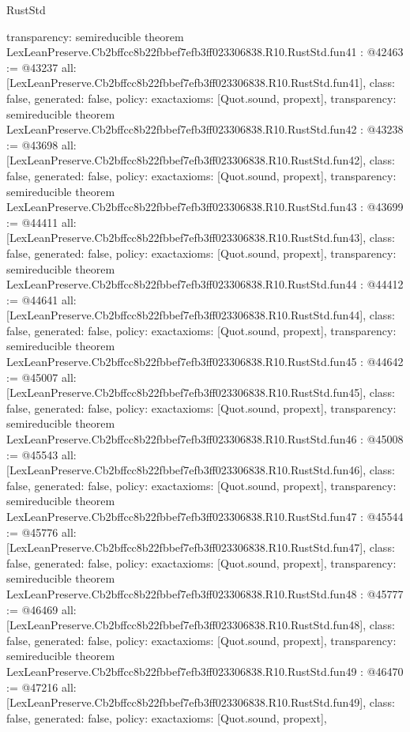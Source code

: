 \begin{lexlean}{RustStd}
\begin{coremodule}
{  transparency: semireducible
}
theorem LexLeanPreserve.Cb2bffcc8b22fbbef7efb3ff023306838.R10.RustStd.fun41 : @42463 := @43237 {
  all: [LexLeanPreserve.Cb2bffcc8b22fbbef7efb3ff023306838.R10.RustStd.fun41],
  class: false,
  generated: false,
  policy: exact{axioms: [Quot.sound, propext]},
  transparency: semireducible
}
theorem LexLeanPreserve.Cb2bffcc8b22fbbef7efb3ff023306838.R10.RustStd.fun42 : @43238 := @43698 {
  all: [LexLeanPreserve.Cb2bffcc8b22fbbef7efb3ff023306838.R10.RustStd.fun42],
  class: false,
  generated: false,
  policy: exact{axioms: [Quot.sound, propext]},
  transparency: semireducible
}
theorem LexLeanPreserve.Cb2bffcc8b22fbbef7efb3ff023306838.R10.RustStd.fun43 : @43699 := @44411 {
  all: [LexLeanPreserve.Cb2bffcc8b22fbbef7efb3ff023306838.R10.RustStd.fun43],
  class: false,
  generated: false,
  policy: exact{axioms: [Quot.sound, propext]},
  transparency: semireducible
}
theorem LexLeanPreserve.Cb2bffcc8b22fbbef7efb3ff023306838.R10.RustStd.fun44 : @44412 := @44641 {
  all: [LexLeanPreserve.Cb2bffcc8b22fbbef7efb3ff023306838.R10.RustStd.fun44],
  class: false,
  generated: false,
  policy: exact{axioms: [Quot.sound, propext]},
  transparency: semireducible
}
theorem LexLeanPreserve.Cb2bffcc8b22fbbef7efb3ff023306838.R10.RustStd.fun45 : @44642 := @45007 {
  all: [LexLeanPreserve.Cb2bffcc8b22fbbef7efb3ff023306838.R10.RustStd.fun45],
  class: false,
  generated: false,
  policy: exact{axioms: [Quot.sound, propext]},
  transparency: semireducible
}
theorem LexLeanPreserve.Cb2bffcc8b22fbbef7efb3ff023306838.R10.RustStd.fun46 : @45008 := @45543 {
  all: [LexLeanPreserve.Cb2bffcc8b22fbbef7efb3ff023306838.R10.RustStd.fun46],
  class: false,
  generated: false,
  policy: exact{axioms: [Quot.sound, propext]},
  transparency: semireducible
}
theorem LexLeanPreserve.Cb2bffcc8b22fbbef7efb3ff023306838.R10.RustStd.fun47 : @45544 := @45776 {
  all: [LexLeanPreserve.Cb2bffcc8b22fbbef7efb3ff023306838.R10.RustStd.fun47],
  class: false,
  generated: false,
  policy: exact{axioms: [Quot.sound, propext]},
  transparency: semireducible
}
theorem LexLeanPreserve.Cb2bffcc8b22fbbef7efb3ff023306838.R10.RustStd.fun48 : @45777 := @46469 {
  all: [LexLeanPreserve.Cb2bffcc8b22fbbef7efb3ff023306838.R10.RustStd.fun48],
  class: false,
  generated: false,
  policy: exact{axioms: [Quot.sound, propext]},
  transparency: semireducible
}
theorem LexLeanPreserve.Cb2bffcc8b22fbbef7efb3ff023306838.R10.RustStd.fun49 : @46470 := @47216 {
  all: [LexLeanPreserve.Cb2bffcc8b22fbbef7efb3ff023306838.R10.RustStd.fun49],
  class: false,
  generated: false,
  policy: exact{axioms: [Quot.sound, propext]},
}
\end{coremodule}
\end{lexlean}

